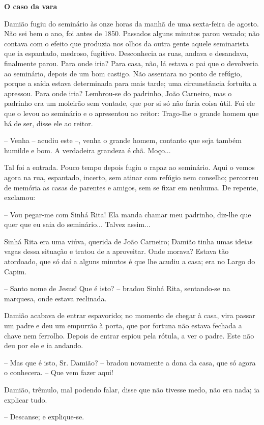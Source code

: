 \textbf{O caso da vara}

Damião fugiu do seminário às onze horas da manhã de uma sexta-feira de
agosto. Não sei bem o ano, foi antes de 1850. Passados alguns minutos
parou vexado; não contava com o efeito que produzia nos olhos da outra
gente aquele seminarista que ia espantado, medroso, fugitivo.
Desconhecia as ruas, andava e desandava, finalmente parou. Para onde
iria? Para casa, não, lá estava o pai que o devolveria ao seminário,
depois de um bom castigo. Não assentara no ponto de refúgio, porque a
saída estava determinada para mais tarde; uma circunstância fortuita a
apressou. Para onde iria? Lembrou-se do padrinho, João Carneiro, mas o
padrinho era um moleirão sem vontade, que por si só não faria coisa
útil. Foi ele que o levou ao seminário e o apresentou ao reitor:
Trago-lhe o grande homem que há de ser, disse ele ao reitor.

-- Venha -- acudiu este --, venha o grande homem, contanto que seja
também humilde e bom. A verdadeira grandeza é chã. Moço...

Tal foi a entrada. Pouco tempo depois fugiu o rapaz ao seminário. Aqui o
vemos agora na rua, espantado, incerto, sem atinar com refúgio nem
conselho; percorreu de memória as casas de parentes e amigos, sem se
fixar em nenhuma. De repente, exclamou:

-- Vou pegar-me com Sinhá Rita! Ela manda chamar meu padrinho, diz-lhe
que quer que eu saia do seminário... Talvez assim...

Sinhá Rita era uma viúva, querida de João Carneiro; Damião tinha umas
ideias vagas dessa situação e tratou de a aproveitar. Onde morava?
Estava tão atordoado, que só daí a alguns minutos é que lhe acudiu a
casa; era no Largo do Capim.

-- Santo nome de Jesus! Que é isto? -- bradou Sinhá Rita, sentando-se na
marquesa, onde estava reclinada.

Damião acabava de entrar espavorido; no momento de chegar à casa, vira
passar um padre e deu um empurrão à porta, que por fortuna não estava
fechada a chave nem ferrolho. Depois de entrar espiou pela rótula, a ver
o padre. Este não deu por ele e ia andando.

-- Mas que é isto, Sr. Damião? -- bradou novamente a dona da casa, que
só agora o conhecera. -- Que vem fazer aqui!

Damião, trêmulo, mal podendo falar, disse que não tivesse medo, não era
nada; ia explicar tudo.

-- Descanse; e explique-se.

